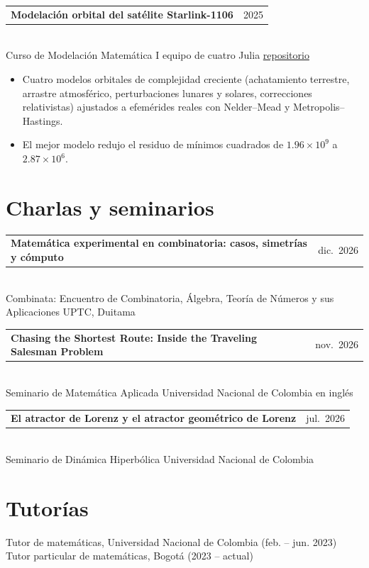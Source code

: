 \documentclass[11pt,a4paper]{article}
\makeatletter
\newcommand{\entry}[3]{%
  \begin{tabularx}{\textwidth}{@{}>{\raggedright\arraybackslash}X@{\hspace{1em}}r@{}}
    \textbf{#1} & {\color{gris}#2}
  \end{tabularx}\\
  {\color{gris}\small #3}\par\vspace{2pt}}
\makeatother
\begin{document}
\entry{Modelaci\'on orbital del sat\'elite Starlink-1106}{2025}{Curso de Modelaci\'on Matem\'atica I
  \textperiodcentered{} equipo de cuatro \textperiodcentered{} Julia \textperiodcentered{}
  \href{https://github.com/Henry2899/starlink-1106-orbit}{repositorio}}
\begin{itemize}
  \item Cuatro modelos orbitales de complejidad creciente (achatamiento terrestre, arrastre atmosf\'erico,
        perturbaciones lunares y solares, correcciones relativistas) ajustados a efem\'erides reales con
        Nelder--Mead y Metropolis--Hastings.
  \item El mejor modelo redujo el residuo de m\'inimos cuadrados de $1.96\times10^{9}$ a
        $2.87\times10^{6}$.
\end{itemize}

\section{Charlas y seminarios}
\entry{Matem\'atica experimental en combinatoria: casos, simetr\'ias y c\'omputo}{dic.\ 2026}{Combinata:
  Encuentro de Combinatoria, \'Algebra, Teor\'ia de N\'umeros y sus Aplicaciones \textperiodcentered{}
  UPTC, Duitama}
\entry{Chasing the Shortest Route: Inside the Traveling Salesman Problem}{nov.\ 2026}{Seminario de
  Matem\'atica Aplicada \textperiodcentered{} Universidad Nacional de Colombia \textperiodcentered{} en ingl\'es}
\entry{El atractor de Lorenz y el atractor geom\'etrico de Lorenz}{jul.\ 2026}{Seminario de Din\'amica
  Hiperb\'olica \textperiodcentered{} Universidad Nacional de Colombia}

\section{Tutor\'ias}
Tutor de matem\'aticas, Universidad Nacional de Colombia (feb. -- jun. 2023) \textperiodcentered{}
Tutor particular de matem\'aticas, Bogot\'a (2023 -- actual)

\end{document}
